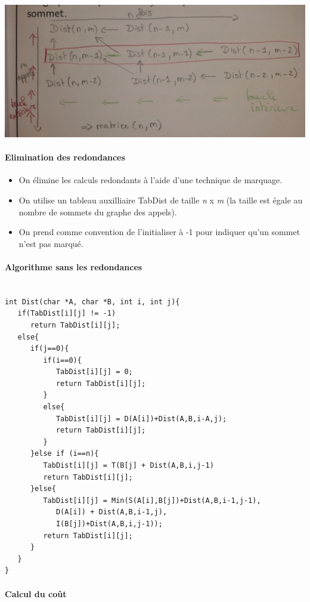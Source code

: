 \includegraphics[width=15cm]{Photo0090}

\paragraph{Elimination des redondances}

\begin{itemize}
\item On élimine les calculs redondants à l'aide d'une technique de marquage.
\item On utilise un tableau auxilliaire TabDist de taille \textit{n} x \textit{m} (la taille est égale au nombre de sommets du graphe des appels).
\item On prend comme convention de l'initialiser à -1 pour indiquer qu'un sommet n'est pas marqué.
\end{itemize}

\paragraph{Algorithme sans les redondances}
\begin{verbatim}

int Dist(char *A, char *B, int i, int j){
   if(TabDist[i][j] != -1)
      return TabDist[i][j];
   else{
      if(j==0){
         if(i==0){
            TabDist[i][j] = 0;
            return TabDist[i][j];
         }
         else{
            TabDist[i][j] = D(A[i])+Dist(A,B,i-A,j);
            return TabDist[i][j];
         }
      }else if (i==n){
         TabDist[i][j] = T(B[j] + Dist(A,B,i,j-1)
         return TabDist[i][j];
      }else{
         TabDist[i][j] = Min(S(A[i],B[j])+Dist(A,B,i-1,j-1),
            D(A[i]) + Dist(A,B,i-1,j),
            I(B[j])+Dist(A,B,i,j-1));
         return TabDist[i][j];
      }
   }
}
\end{verbatim}
\paragraph{Calcul du coût}

